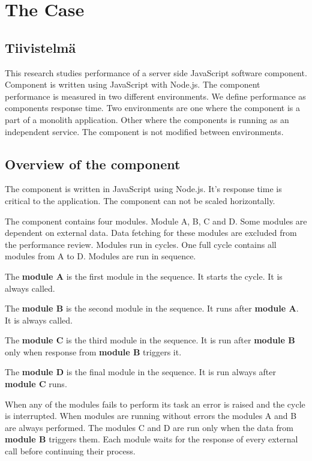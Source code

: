 \chapter{The Case\label{case}}
\section{Tiivistelmä}
This research studies performance of a server side JavaScript software component.
Component is written using JavaScript with Node.js.
The component performance is measured in two different environments.
We define performance as components response time.
Two environments are one where the component is a part of a monolith application.
Other where the components is running as an independent service.
The component is not modified between environments.

\section{Overview of the component}
The component is written in JavaScript using Node.js.
It's response time is critical to the application.
The component can not be scaled horizontally.

The component contains four modules.
Module A, B, C and D.
Some modules are dependent on external data.
Data fetching for these modules are excluded from the performance review.
Modules run in cycles.
One full cycle contains all modules from A to D.
Modules are run in sequence.

The \textbf{module A} is the first module in the sequence.
It starts the cycle.
It is always called.

The \textbf{module B} is the second module in the sequence.
It runs after \textbf{module A}.
It is always called.

The \textbf{module C} is the third module in the sequence.
It is run after \textbf{module B} only when response from \textbf{module B} triggers it.

The \textbf{module D} is the final module in the sequence.
It is run always after \textbf{module C} runs.

When any of the modules fails to perform its task an error is raised and the cycle is interrupted.
When modules are running without errors the modules A and B are always performed. 
The modules C and D are run only when the data from \textbf{module B} triggers them.
Each module waits for the response of every external call before continuing their process.

